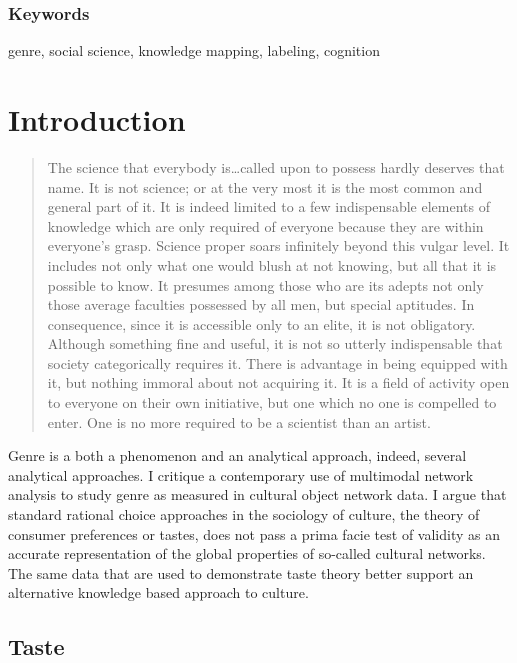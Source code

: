 \documentclass[]{book}
\theoremstyle{definition}
\theoremstyle{definition}
\theoremstyle{definition}
\theoremstyle{remark}
\begin{document}
\hypertarget{keywords-1}{%
\subsubsection*{Keywords}\label{keywords-1}}


genre, social science, knowledge mapping, labeling,
cognition

\hypertarget{introduction}{%
\section{Introduction}\label{introduction}}

\begin{quote}
The science that everybody is\ldots called upon to possess hardly
deserves that name. It is not science; or at the very most it is the
most common and general part of it. It is indeed limited to a few
indispensable elements of knowledge which are only required of everyone
because they are within everyone's grasp. Science proper soars
infinitely beyond this vulgar level. It includes not only what one would
blush at not knowing, but all that it is possible to know. It presumes
among those who are its adepts not only those average faculties
possessed by all men, but special aptitudes. In consequence, since it is
accessible only to an elite, it is not obligatory. Although something
fine and useful, it is not so utterly indispensable that society
categorically requires it. There is advantage in being equipped with it,
but nothing immoral about not acquiring it. It is a field of activity
open to everyone on their own initiative, but one which no one is
compelled to enter. One is no more required to be a scientist than an
artist. \citep[43]{Durkheim1893division}
\end{quote}

Genre is a both a phenomenon and an analytical approach, indeed, several
analytical approaches. I critique a contemporary use of multimodal
network analysis to study genre as measured in cultural object network
data. I argue that standard rational choice approaches in the sociology
of culture, the theory of consumer preferences or tastes, does not pass
a prima facie test of validity as an accurate representation of the
global properties of so-called cultural networks. The same data that are
used to demonstrate taste theory better support an alternative knowledge
based approach to culture.

\hypertarget{taste}{%
\subsection{Taste}\label{taste}}
\end{document}
